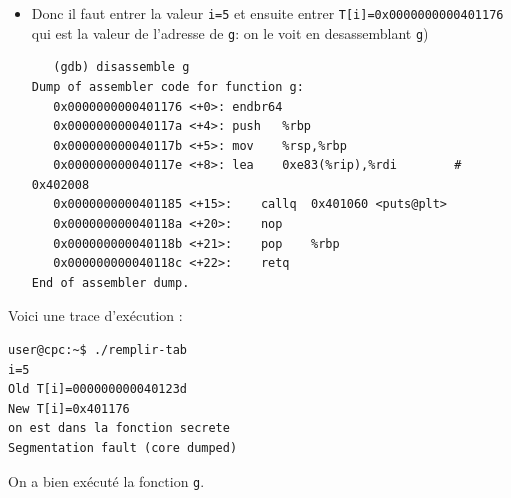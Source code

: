\documentclass[a4paper,9pt]{article}
\newenvironment{terminal}{\color{black}\begin{snugshade*}}
{\end{snugshade*}\color{black}}
\theoremstyle{plain}
\theoremstyle{definition}
\begin{document}
\begin{correction}
\begin{enumerate}
\begin{itemize}
    \verb|T[0]| est situé à l'adresse \verb|rbp-0x20|, ..., \verb|T[3]| est situé à l'adresse \verb|rbp-0x8|. Donc \verb|T[4]| sera situé à l'adresse \verb|rbp| et \verb|T[5]| sera à l'adresse \verb|rbp+8| qui est celle de savedrip.
  \item Donc il faut entrer la valeur \verb|i=5|  et ensuite  entrer \verb|T[i]=0x0000000000401176| qui est la valeur de l'adresse de \verb|g|: on le voit en desassemblant \verb|g|) 
     \begin{terminal}
\begin{verbatim}
   (gdb) disassemble g
Dump of assembler code for function g:
   0x0000000000401176 <+0>:	endbr64 
   0x000000000040117a <+4>:	push   %rbp
   0x000000000040117b <+5>:	mov    %rsp,%rbp
   0x000000000040117e <+8>:	lea    0xe83(%rip),%rdi        # 0x402008
   0x0000000000401185 <+15>:	callq  0x401060 <puts@plt>
   0x000000000040118a <+20>:	nop
   0x000000000040118b <+21>:	pop    %rbp
   0x000000000040118c <+22>:	retq   
End of assembler dump.
\end{verbatim}
    \end{terminal}
  \end{itemize}
  Voici une trace d'exécution :
  \begin{terminal}
\begin{verbatim}
user@cpc:~$ ./remplir-tab 
i=5
Old T[i]=000000000040123d
New T[i]=0x401176
on est dans la fonction secrete
Segmentation fault (core dumped)
\end{verbatim}
\end{terminal}
  On a bien exécuté la fonction \verb|g|.


\end{enumerate}
\end{correction}
\end{document}
